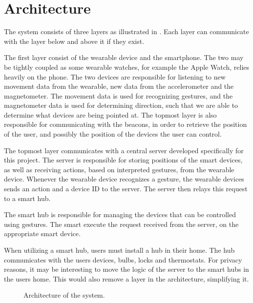\section{Architecture}\label{sec:architecture}
The system consists of three layers as illustrated in . 
Each layer can communicate with the layer below and above it if they exist.

The first layer consist of the wearable device and the smartphone. 
The two may be tightly coupled as some wearable watches, 
for example the Apple Watch, relies heavily on the phone. 
The two devices are responsible for listening to new movement data from the wearable, 
\eg new data from the accelerometer and the magnetometer.
The movement data is used for recognizing gestures, 
and the magnetometer data is used for determining direction, 
such that we are able to determine what devices are being pointed at. 
The topmost layer is also responsible for communicating with the beacons, 
in order to retrieve the position of the user, 
and possibly the position of the devices the user can control. 

The topmost layer communicates with a central server developed specifically for this project. 
The server is responsible for storing positions of the smart devices, 
as well as receiving actions, based on interpreted gestures, from the wearable device.
Whenever the wearable device recognizes a gesture, 
the wearable devices sends an action and a device ID to the server.
The server then relays this request to a smart hub. 

The smart hub is responsible for managing the devices that can be controlled using gestures. 
The smart execute the request received from the server, 
on the appropriate smart device. 

When utilizing a smart hub, users must install a hub in their home. 
The hub communicates with the users devices, \eg bulbs, locks and thermostats. 
For privacy reasons, it may be interesting to move the logic of the server to the smart hubs in the users home. 
This would also remove a layer in the architecture, simplifying it.

\begin{figure}[H]
  \centering
  
  \caption{Architecture of the system.}
  \label{fig:architecture}
\end{figure}

